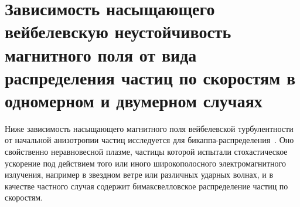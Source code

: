 \chapter{Зависимость насыщающего вейбелевскую неустойчивость магнитного поля от вида распределения частиц по скоростям в одномерном и двумерном случаях}
\newcommand{\PunctumKappa}{-}
\label{ch:ch5}
Ниже зависимость насыщающего магнитного поля вейбелевской турбулентности от начальной анизотропии частиц исследуется для бикаппа{\PunctumKappa}распределения~\cite{Vasyliunas1968, Lazar2010, Livadiotis2017, Livadiotis2021, Pierrard2010}. Оно свойственно неравновесной плазме, частицы которой испытали стохастическое ускорение под действием того или иного широкополосного электромагнитного излучения, например в звездном ветре или различных ударных волнах, и в качестве частного случая содержит бимаксвелловское распределение частиц по скоростям. 

